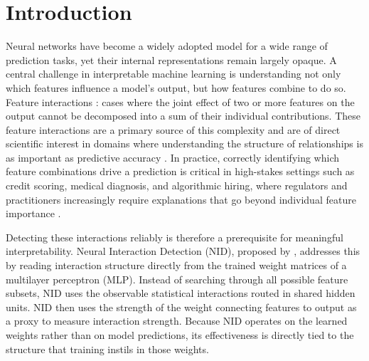 \documentclass{article}
\begin{document}
\fancyhead[R]{\small \nouppercase{\leftmark}}

\fancyfoot[C]{\thepage}

\renewcommand{\headrulewidth}{0.4pt}
\renewcommand{\footrulewidth}{0pt}
\tableofcontents
\newpage


\section{Introduction}

Neural networks have become a widely adopted model for a wide range of prediction tasks, yet their internal representations remain largely opaque.
A central challenge in interpretable machine learning is understanding not only
which features influence a model's output, but how features combine to do so.
Feature interactions : cases where the joint effect of two or more features on the output cannot be decomposed into a sum of their individual contributions. These feature interactions are a primary source of this complexity and are of direct scientific interest in domains where understanding the structure of relationships is as important as
predictive accuracy \citep{tsang2020featureinteractioninterpretabilitycase,
enouen2023sparseinteractionadditivenetworks}. In practice, correctly identifying
which feature combinations drive a prediction is critical in high-stakes settings
such as credit scoring, medical diagnosis, and algorithmic hiring, where
regulators and practitioners increasingly require explanations that go beyond
individual feature importance \citep{NEURIPS2020_443dec30}.


Detecting these interactions reliably is therefore a prerequisite for meaningful
interpretability. Neural Interaction Detection (NID), proposed by
\cite{tsang2017detecting}, addresses this by reading interaction structure
directly from the trained weight matrices of a multilayer perceptron (MLP).
Instead of searching through all possible feature subsets, NID uses the observable statistical interactions routed in shared hidden units.   NID then uses the strength of the weight connecting features to output as a proxy to measure interaction strength.
Because NID operates on the learned weights rather than on model predictions, its
effectiveness is directly tied to the structure that training instils in those
weights.
\end{document}
